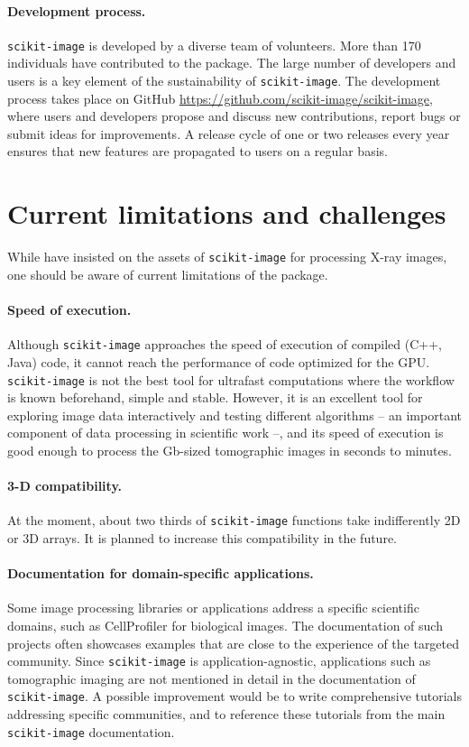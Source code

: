 \documentclass[twocolumn]{bmcart}%
\begin{document}
\paragraph{Development process.}

\texttt{scikit-image} is developed by a diverse team of volunteers.
More than 170 individuals have contributed to the package. The large
number of developers and users is a key element of the sustainability of
\texttt{scikit-image}. The
development process takes place on GitHub
\url{https://github.com/scikit-image/scikit-image}, where users and
developers propose and discuss new contributions, report bugs or submit ideas
for improvements.
A release cycle of one or two releases every year
ensures that new features are propagated to users on a regular basis.

\section*{Current limitations and challenges}

While have insisted on the assets of \texttt{scikit-image} for processing
X-ray images, one should be aware of current limitations of the package.

\paragraph{Speed of execution.} Although \texttt{scikit-image} approaches
the speed of execution of compiled (C++, Java) code, it cannot reach the
performance of code optimized for the GPU. \texttt{scikit-image} is not
the best tool for ultrafast computations where the workflow is known
beforehand, simple and stable. However, it is an excellent tool for
exploring image data interactively and testing different algorithms -- an
important component of data processing in scientific work --, and its
speed of execution is good enough to process the Gb-sized tomographic
images in seconds to minutes.

\paragraph{3-D compatibility.} At the moment, about two thirds of
\texttt{scikit-image} functions take indifferently 2D or 3D arrays. It is
planned to increase this compatibility in the future.

\paragraph{Documentation for domain-specific applications.} Some image
processing libraries or applications address a specific scientific
domains, such as CellProfiler \citep{Carpenter2006, Lamprecht2007} for
biological images. The documentation of such projects often showcases
examples that are close to the experience of the targeted community.
Since \texttt{scikit-image} is application-agnostic,
applications such as tomographic imaging are not mentioned in detail in the
documentation of \texttt{scikit-image}. A possible improvement would be
to write comprehensive tutorials addressing specific communities, and to
reference these tutorials from the main \texttt{scikit-image}
documentation.
\end{document}
